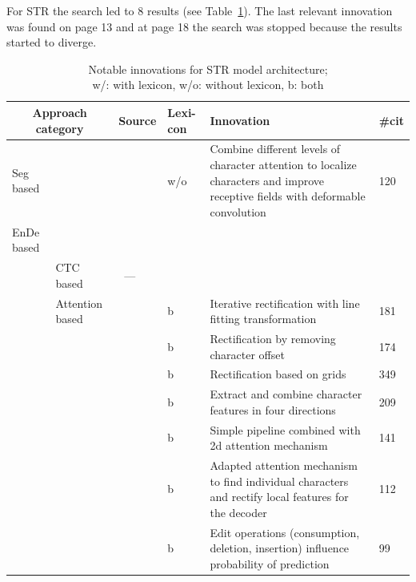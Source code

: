 For \ac{STR} the search led to 8 results (see Table~\ref{tb:STR-steps-properties}).
The last relevant innovation was found on page 13 and at page 18 the search was stopped because
the results started to diverge.
\begin{table}[h]
    \centering\scriptsize
    \begin{tabular}{p{}p{}p{}p{}
            p{}p{}}
        \multicolumn{2}{c}{Approach category} & Source & Lexi-con & Innovation & \#cit \\
        \toprule
        Seg based & &~\cite{liao_scene_2018} & w/o & Combine different levels of character attention
            to localize characters and improve receptive fields with deformable convolution & 120 \\
        \midrule
        \ac{EnDe} based & & & \\
            & CTC based &~--- & & \\
            & Attention based &~\cite{zhan_esir_2019} & b & Iterative rectification with line fitting
                transformation & 181 \\
            & &~\cite{luo_multi-object_2019} & b & Rectification by removing character offset & 174 \\
            & &~\cite{shi_aster_2019} & b & Rectification based on grids & 349 \\
            & &~\cite{cheng_aon_2018} & b & Extract and combine character features in four directions
                & 209 \\
            & &~\cite{li_show_2019} & b & Simple pipeline combined with 2d attention mechanism & 141\\
            & &~\cite{liu_char-net_2018} & b & Adapted attention mechanism to find
                individual characters and rectify local features for the decoder & 112 \\
            & &~\cite{bai_edit_2018} & b & Edit operations (consumption, deletion, insertion)
                influence probability of prediction & 99 \\
        \bottomrule
    \end{tabular}
    \captionsetup{justification=centering}
    \caption[Notable innovations for STR model architecture]{%
        Notable innovations for STR model architecture; \\
        w/: with lexicon, w/o: without lexicon, b: both\label{tb:STR-steps-properties}
    }
\end{table}
